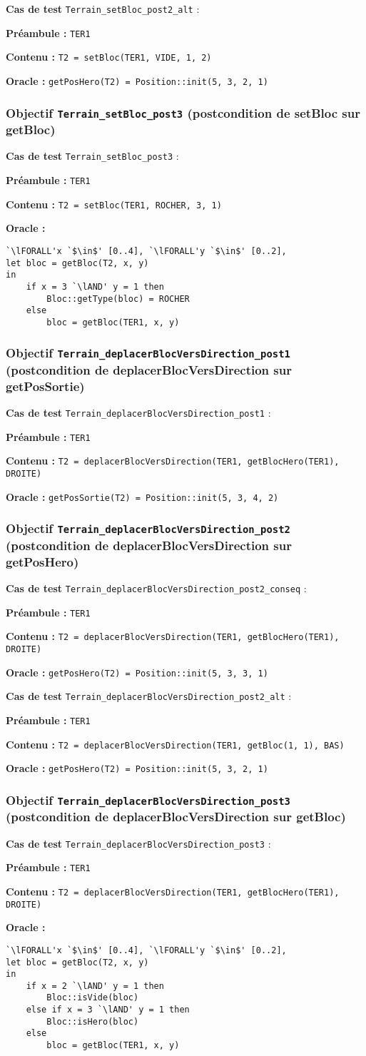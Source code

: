 \documentclass{article}
\newcommand{\cmd}[1]{\texttt{#1}}
\newcommand{\lAND}{$\land$}
\newcommand{\lFORALL}{$\forall$}
\newcommand{\obj}[2]{\subsubsection*{\large{\textbf{Objectif {\cmd{#1} (#2)}}}}}
\newenvironment{cas}[1]
{
	\hspace{1em}\textbf{Cas de test} \cmd{#1} :
	\begin{list}{}{}
}{
	\end{list}\vspace{1em}
}
\newcommand{\pre}[1]{\item \textbf{Préambule :} \cmd{#1}}
\newcommand{\ope}[1]{\item \textbf{Contenu :} \cmd{#1}}
\newcommand{\ora}[1]{\item \textbf{Oracle :} \cmd{#1}}
\newcommand{\oram}{\item \textbf{Oracle :}}
\begin{document}
	\begin{cas} {Terrain\_setBloc\_post2\_alt}
		\pre{TER1}
		\ope{T2 = setBloc(TER1, VIDE, 1, 2)}
		\ora{getPosHero(T2) = Position::init(5, 3, 2, 1)}
	\end{cas}

\obj{Terrain\_setBloc\_post3} {postcondition de setBloc sur getBloc}
	\begin{cas} {Terrain\_setBloc\_post3}
		\pre{TER1}
		\ope{T2 = setBloc(TER1, ROCHER, 3, 1)}
		\oram{}
		\begin{lstlisting}
`\lFORALL'x `$\in$' [0..4], `\lFORALL'y `$\in$' [0..2],
let bloc = getBloc(T2, x, y)
in
	if x = 3 `\lAND' y = 1 then
		Bloc::getType(bloc) = ROCHER
	else
		bloc = getBloc(TER1, x, y)
		\end{lstlisting}
	\end{cas}

\obj{Terrain\_deplacerBlocVersDirection\_post1} {postcondition de deplacerBlocVersDirection sur getPosSortie}
	\begin{cas} {Terrain\_deplacerBlocVersDirection\_post1}
		\pre{TER1}
		\ope{T2 = deplacerBlocVersDirection(TER1, getBlocHero(TER1), DROITE)}
		\ora{getPosSortie(T2) = Position::init(5, 3, 4, 2)}
	\end{cas}

\obj{Terrain\_deplacerBlocVersDirection\_post2} {postcondition de deplacerBlocVersDirection sur getPosHero}
	\begin{cas} {Terrain\_deplacerBlocVersDirection\_post2\_conseq}
		\pre{TER1}
		\ope{T2 = deplacerBlocVersDirection(TER1, getBlocHero(TER1), DROITE)}
		\ora{getPosHero(T2) = Position::init(5, 3, 3, 1)}
	\end{cas}

	\begin{cas} {Terrain\_deplacerBlocVersDirection\_post2\_alt}
		\pre{TER1}
		\ope{T2 = deplacerBlocVersDirection(TER1, getBloc(1, 1), BAS)}
		\ora{getPosHero(T2) = Position::init(5, 3, 2, 1)}
	\end{cas}

\obj{Terrain\_deplacerBlocVersDirection\_post3} {postcondition de deplacerBlocVersDirection sur getBloc}
	\begin{cas} {Terrain\_deplacerBlocVersDirection\_post3}
		\pre{TER1}
		\ope{T2 = deplacerBlocVersDirection(TER1, getBlocHero(TER1), DROITE)}
		\oram{}
		\begin{lstlisting}
`\lFORALL'x `$\in$' [0..4], `\lFORALL'y `$\in$' [0..2],
let bloc = getBloc(T2, x, y)
in
	if x = 2 `\lAND' y = 1 then
		Bloc::isVide(bloc)
	else if x = 3 `\lAND' y = 1 then
		Bloc::isHero(bloc)
	else
		bloc = getBloc(TER1, x, y)
		\end{lstlisting}
	\end{cas}
\end{document}
